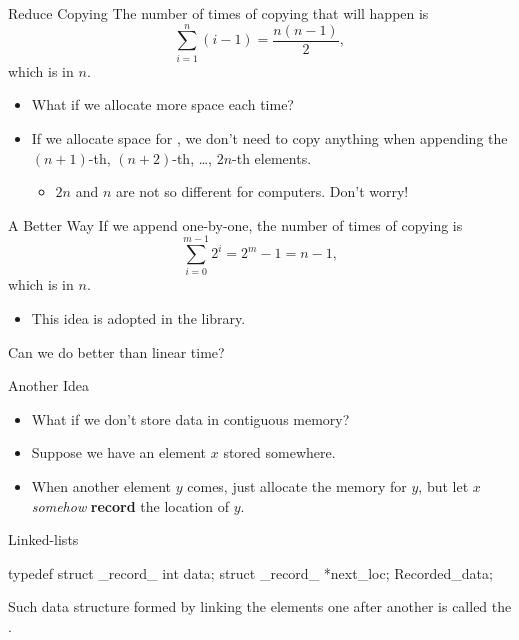 \documentclass{beamer}
\begin{document}
\begin{frame}{Reduce Copying}
    The number of times of copying that will happen is
    \[\sum_{i=1}^n(i-1)=\frac{n(n-1)}2,\]
    which is  in \(n\). 
    \pause
    \begin{itemize}
        \item What if we allocate more space each time?
        \pause
        \item If we allocate space for , we don't need to copy anything when appending the \((n+1)\)-th, \((n+2)\)-th, \dots, \(2n\)-th elements.
        \pause
        \begin{itemize}
            \item \(2n\) and \(n\) are not so different for computers. Don't worry!
        \end{itemize}
    \end{itemize}
\end{frame}

\begin{frame}{A Better Way}
    If we append  one-by-one, the number of times of copying is
    \[\sum_{i=0}^{m-1}2^i=2^m-1=n-1,\]
    which is  in \(n\).
    \begin{itemize}
        \item This idea is adopted in the  library.
    \end{itemize}
    \pause
    \begin{question}
        Can we do better than linear time?
    \end{question}
\end{frame}

\begin{frame}{Another Idea}
    \begin{itemize}
        \item What if we don't store data in contiguous memory?
        \pause
        \item Suppose we have an element \(x\) stored somewhere.
        \item When another element \(y\) comes, just allocate the memory for \(y\), but let \(x\) \textit{somehow} \textbf{record} the location of \(y\).
    \end{itemize}
\end{frame}

\begin{frame}[fragile]{Linked-lists}
    \begin{cpp}
typedef struct _record_ {
  int data;
  struct _record_ *next_loc;
} Recorded_data;
    \end{cpp}
    \pause
    Such data structure formed by linking the elements one after another is called the .
\end{frame}
\end{document}
